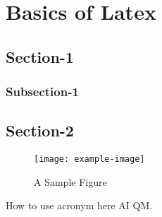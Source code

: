 \chapter{Basics of Latex}\label{Chapter_2}
\section{Section-1}
\lipsum[1-4] %
\subsection{Subsection-1}
\lipsum[1-2]
\lipsum[1-4] %

\section{Section-2}
\lipsum[1-2]
\begin{figure}[ht]
  \centering
  \texttt{[image: example-image]}
  \caption{A Sample Figure}
  \label{fig:sample}
\end{figure}

How to use acronym here \ac{AI} \ac{QM}. \\


\lipsum[1-5] %